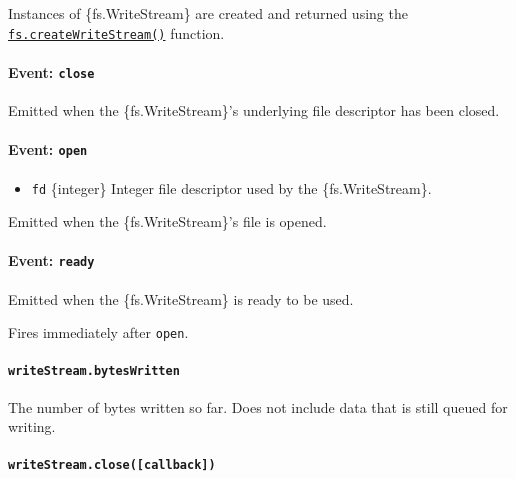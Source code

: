 Instances of \{fs.WriteStream\} are created and returned using the
\hyperref[fscreatewritestreampath-options]{\texttt{fs.createWriteStream()}}
function.

\paragraph{\texorpdfstring{Event:
\texttt{\textquotesingle{}close\textquotesingle{}}}{Event: \textquotesingle close\textquotesingle{}}}\label{event-close-3}

Emitted when the \{fs.WriteStream\}'s underlying file descriptor has
been closed.

\paragraph{\texorpdfstring{Event:
\texttt{\textquotesingle{}open\textquotesingle{}}}{Event: \textquotesingle open\textquotesingle{}}}\label{event-open-1}

\begin{itemize}
\tightlist
\item
  \texttt{fd} \{integer\} Integer file descriptor used by the
  \{fs.WriteStream\}.
\end{itemize}

Emitted when the \{fs.WriteStream\}'s file is opened.

\paragraph{\texorpdfstring{Event:
\texttt{\textquotesingle{}ready\textquotesingle{}}}{Event: \textquotesingle ready\textquotesingle{}}}\label{event-ready-1}

Emitted when the \{fs.WriteStream\} is ready to be used.

Fires immediately after
\texttt{\textquotesingle{}open\textquotesingle{}}.

\paragraph{\texorpdfstring{\texttt{writeStream.bytesWritten}}{writeStream.bytesWritten}}\label{writestream.byteswritten}

The number of bytes written so far. Does not include data that is still
queued for writing.

\paragraph{\texorpdfstring{\texttt{writeStream.close({[}callback{]})}}{writeStream.close({[}callback{]})}}\label{writestream.closecallback}

